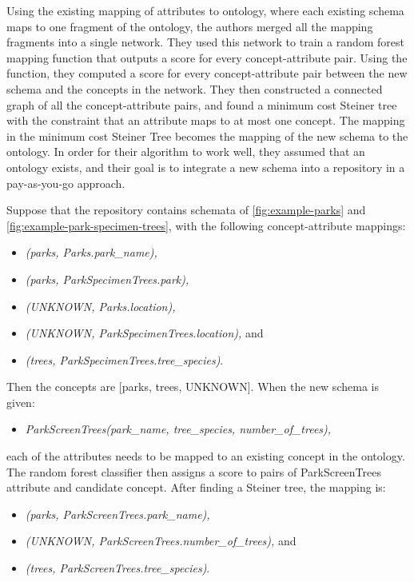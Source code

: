 Using the existing mapping of attributes to ontology, where each existing schema maps to one fragment of the ontology, the authors merged all the mapping fragments into a single network. They used this network to train a random forest mapping function that outputs a score for every concept-attribute pair. Using the function, they computed a score for every concept-attribute pair between the new schema and the concepts in the network. They then constructed a connected graph of all the concept-attribute pairs, and found a minimum cost Steiner tree with the constraint that an attribute maps to at most one concept. The mapping in the minimum cost Steiner Tree becomes the mapping of the new schema to the ontology. In order for their algorithm to work well, they assumed that an ontology exists, and their goal is to integrate a new schema into a repository in a pay-as-you-go approach.

Suppose that the repository contains schemata of \autoref{fig:example-parks} and \autoref{fig:example-park-specimen-trees}, with the following concept-attribute mappings:
\begin{itemize}
	\item[] \textit{(parks, Parks.park\_name),}
	\item[] \textit{(parks, ParkSpecimenTrees.park),}
	\item[] \textit{(UNKNOWN, Parks.location),}
	\item[] \textit{(UNKNOWN, ParkSpecimenTrees.location),} and
	\item[] \textit{(trees, ParkSpecimenTrees.tree\_species)}.
\end{itemize}

Then the concepts are [parks, trees, UNKNOWN]. When the new schema is given:
\begin{itemize}
	\item[] \textit{ParkScreenTrees(park\_name, tree\_species, number\_of\_trees),}
\end{itemize}
each of the attributes needs to be mapped to an existing concept in the ontology. The random forest classifier then assigns a score to pairs of ParkScreenTrees attribute and candidate concept. 
After finding a Steiner tree, the mapping is:
\begin{itemize}
	\item[] \textit{(parks, ParkScreenTrees.park\_name),}
	\item[] \textit{(UNKNOWN, ParkScreenTrees.number\_of\_trees),} and
	\item[] \textit{(trees, ParkScreenTrees.tree\_species)}.
\end{itemize}

